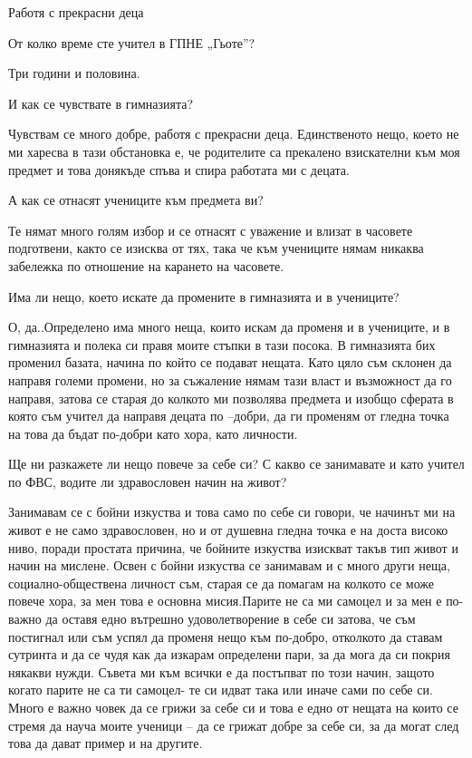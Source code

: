 \begin{multicols}{3} Работя с прекрасни деца

От колко време сте учител в ГПНЕ „Гьоте”?

Три години и половина.

И как се чувствате в гимназията?

Чувствам се много добре, работя с прекрасни деца.  Единственото нещо, което не ми харесва в тази обстановка  е,  че родителите са прекалено взискателни към моя предмет и това донякъде спъва и спира работата ми с децата.

А как се отнасят учениците към предмета ви?

Те нямат много голям избор и се отнасят с уважение и влизат в часовете подготвени, както се изисква от тях, така че към учениците нямам никаква забележка по отношение на карането на часовете.

Има ли нещо,  което искате да промените в гимназията и в учениците?

О, да..Определено има  много неща, които искам да променя и в учениците, и в гимназията и  полека си правя моите стъпки в тази посока. В гимназията бих променил базата, начина по който  се подават нещата. Като цяло съм склонен да направя големи промени, но за съжаление нямам тази власт и възможност да го направя, затова се старая до колкото ми позволява предмета и изобщо сферата в която съм учител да направя децата по –добри, да ги променям от гледна точка на това  да бъдат по-добри като хора, като личности.

Ще ни разкажете ли нещо повече за себе си? С какво се занимавате и като учител по ФВС,  водите ли здравословен начин на живот?

Занимавам се с бойни изкуства и това само по себе си говори,  че начинът ми на живот е не само здравословен, но и от душевна гледна точка е на доста високо ниво, поради простата причина, че бойните изкуства изискват такъв тип живот  и начин на мислене. Освен с бойни изкуства се занимавам и с много други неща, социално-обществена личност съм, старая се да помагам на колкото се може повече хора, за мен това е основна мисия.Парите не са ми самоцел и за мен е по-важно да оставя едно вътрешно удоволетворение  в себе си затова,  че съм постигнал  или съм успял да променя нещо към по-добро, отколкото да ставам сутринта и да се чудя как да изкарам определени пари,  за да мога да си покрия някакви нужди. Съвета ми към всички е да постъпват по този начин, защото когато парите не са ти самоцел- те си идват така или иначе сами по себе си. Много  е важно човек да се  грижи за себе си и това е едно от нещата на които се стремя да науча моите ученици – да се грижат добре за себе си, за да могат след това да дават  пример и на другите.


\end{multicols}
